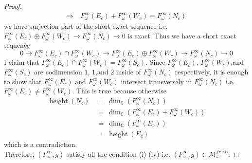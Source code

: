 \begin{proof}
\begin{align*}
\Rightarrow~& F_\omega^\infty(E_c) + F_\omega^\infty(W_c) = F_\omega^\infty(N_c)
\end{align*}
we have surjection part of the short exact sequence i.e. $F_\omega^\infty(E_c)\oplus F_\omega^\infty(W_c)\rightarrow F_\omega^\infty(N_c)\rightarrow 0$ is exact. Thus we have a short exact sequence
\[
0\rightarrow F_\omega^\infty(E_c)\cap F_\omega^\infty(W_c) \rightarrow F_\omega^\infty(E_c)\oplus F_\omega^\infty(W_c)\rightarrow F_\omega^\infty(N_c)\rightarrow 0
\] 
I claim that $F_\omega^\infty(E_c)\cap F_\omega^\infty(W_c) = F_\omega^\infty (S_c)$. Since $F_\omega^\infty(E_c)$, $F_\omega^\infty(W_c)$,and $F_\omega^\infty(S_c)$ are codimension $1$, $1$,and $2$ inside of $F_\omega^\infty(N_c)$ respectively, it is enough to show that $F_\omega^\infty(E_c)$ and $F_\omega^\infty(W_c)$ intersect transversely in $F_\omega^\infty(N_c)$ i.e. $F_\omega^\infty(E_c) \neq F_\omega^\infty(W_c)$. This is true because otherwise
\begin{align*}
\operatorname{height}(N_c)~&=~\operatorname{dim}_\mathbb{C}(F_\omega^\infty(N_c))\\
&=~\operatorname{dim}_\mathbb{C}(F_\omega^\infty(E_c)+F_\omega^\infty(W_c))\\
&=~\operatorname{dim}_\mathbb{C}(F_\omega^\infty(E_c))\\
&=~\operatorname{height}(E_c) 
\end{align*}
which is a contradiction.\\
Therefore, $(F_\omega^\infty, g)$ satisfy all the condition (\Rn{1})-(\Rn{4}) i.e. $(F_\omega^\infty, g)\in \mathcal{M}_\omega^{fr,\infty}$.
\end{proof}


